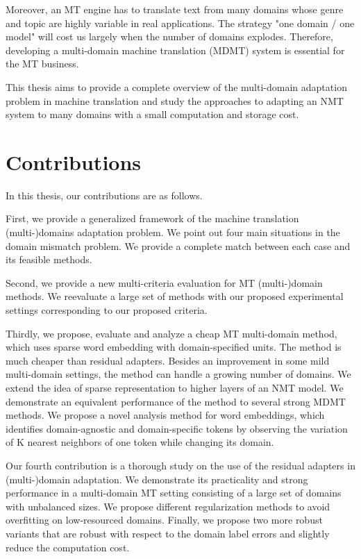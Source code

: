 Moreover, an MT engine has to translate text from many domains whose genre and topic are highly variable in real applications. The strategy "one domain / one model" will cost us largely when the number of domains explodes. Therefore, developing a multi-domain machine translation (MDMT) system is essential for the MT business.

This thesis aims to provide a complete overview of the multi-domain adaptation problem in machine translation and study the approaches to adapting an NMT system to many domains with a small computation and storage cost.

\section{Contributions}
In this thesis, our contributions are as follows.

First, we provide a generalized framework of the machine translation (multi-)domains adaptation problem. We point out four main situations in the domain mismatch problem. We provide a complete match between each case and its feasible methods.

Second, we provide a new multi-criteria evaluation for MT (multi-)domain methods. We reevaluate a large set of methods with our proposed experimental settings corresponding to our proposed criteria.

Thirdly, we propose, evaluate and analyze a cheap MT multi-domain method, which uses sparse word embedding with domain-specified units. The method is much cheaper than residual adapters. Besides an improvement in some mild multi-domain settings, the method can handle a growing number of domains. We extend the idea of sparse representation to higher layers of an NMT model. We demonstrate an equivalent performance of the method to several strong MDMT methods. We propose a novel analysis method for word embeddings, which identifies domain-agnostic and domain-specific tokens by observing the variation of K nearest neighbors of one token while changing its domain.

Our fourth contribution is a thorough study on the use of the residual adapters in (multi-)domain adaptation. We demonstrate its practicality and strong performance in a multi-domain MT setting consisting of a large set of domains with unbalanced sizes. We propose different regularization methods to avoid overfitting on low-resourced domains. Finally, we propose two more robust variants that are robust with respect to the domain label errors and slightly reduce the computation cost.


